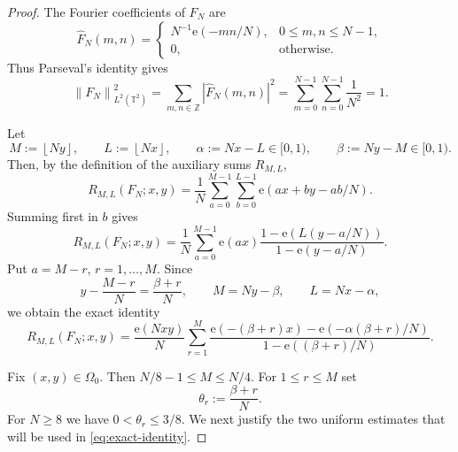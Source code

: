 \documentclass[11pt]{amsart}
\numberwithin{equation}{section}
\begin{document}
\begin{proof}
The Fourier coefficients of $F_N$ are 
\begin{equation*}
\widehat F_N(m,n)= 
\begin{cases}
N^{-1}\mathrm{e}\!\left(-mn/N\right), & 0\le m,n\le N-1, \\ 
0, & \text{otherwise.}%
\end{cases}%
\end{equation*}
Thus Parseval's identity gives 
\begin{equation*}
\left\|F_N\right\|_{L^2(\mathbb{T}^2)}^2 =\sum_{m,n\in\mathbb{Z}%
}\left|\widehat F_N(m,n)\right|^2
=\sum_{m=0}^{N-1}\sum_{n=0}^{N-1}\frac1{N^2}=1.
\end{equation*}

Let 
\begin{equation*}
M:=\left\lfloor Ny\right\rfloor ,\qquad L:=\left\lfloor Nx\right\rfloor
,\qquad \alpha :=Nx-L\in \lbrack 0,1),\qquad \beta :=Ny-M\in \lbrack 0,1).
\end{equation*}%
Then, by the definition of the auxiliary sums $R_{M,L}$, 
\begin{equation}
R_{M,L}(F_{N};x,y)=\frac{1}{N}\sum_{a=0}^{M-1}\sum_{b=0}^{L-1}\mathrm{e}%
\!\left( ax+by-ab/N\right) .  \label{eq:R-first}
\end{equation}%
Summing first in $b$ gives 
\begin{equation*}
R_{M,L}(F_{N};x,y)=\frac{1}{N}\sum_{a=0}^{M-1}\mathrm{e}\!\left( ax\right) 
\frac{1-\mathrm{e}\!\left( L(y-a/N)\right) }{1-\mathrm{e}\!\left(
y-a/N\right) }.
\end{equation*}%
Put $a=M-r$, $r=1,\dots ,M$. Since 
\begin{equation*}
y-\frac{M-r}{N}=\frac{\beta +r}{N},\qquad M=Ny-\beta ,\qquad L=Nx-\alpha ,
\end{equation*}%
we obtain the exact identity 
\begin{equation}
R_{M,L}(F_{N};x,y)=\frac{\mathrm{e}\!\left( Nxy\right) }{N}\sum_{r=1}^{M}%
\frac{\mathrm{e}\!\left( -(\beta +r)x\right) -\mathrm{e}\!\left( -\alpha
(\beta +r)/N\right) }{1-\mathrm{e}\!\left( (\beta +r)/N\right) }.
\label{eq:exact-identity}
\end{equation}

Fix $(x,y)\in\Omega_0$. Then $N/8-1\le M\le N/4$. For $1\le r\le M$ set 
\begin{equation*}
\theta_r:=\frac{\beta+r}{N}.
\end{equation*}
For $N\ge8$ we have $0<\theta_r\le3/8$. We next justify the two uniform
estimates that will be used in \eqref{eq:exact-identity}.


\end{proof}
\end{document}

